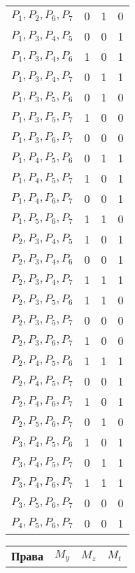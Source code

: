 \documentclass[11pt, oneside]{article}   	%
\begin{document}
\begin{table}
\begin{minipage}[t]{.3\textwidth}
\begin{tabular}{cccc}
$ P_{1}, P_{2}, P_{6}, P_{7} $ & 0 & 1 & 0 \\
$ P_{1}, P_{3}, P_{4}, P_{5} $ & 0 & 0 & 1 \\
$ P_{1}, P_{3}, P_{4}, P_{6} $ & 1 & 0 & 1 \\
$ P_{1}, P_{3}, P_{4}, P_{7} $ & 0 & 1 & 1 \\
$ P_{1}, P_{3}, P_{5}, P_{6} $ & 0 & 1 & 0 \\
$ P_{1}, P_{3}, P_{5}, P_{7} $ & 1 & 0 & 0 \\
$ P_{1}, P_{3}, P_{6}, P_{7} $ & 0 & 0 & 0 \\
$ P_{1}, P_{4}, P_{5}, P_{6} $ & 0 & 1 & 1 \\
$ P_{1}, P_{4}, P_{5}, P_{7} $ & 1 & 0 & 1 \\
$ P_{1}, P_{4}, P_{6}, P_{7} $ & 0 & 0 & 1 \\
$ P_{1}, P_{5}, P_{6}, P_{7} $ & 1 & 1 & 0 \\
$ P_{2}, P_{3}, P_{4}, P_{5} $ & 1 & 0 & 1 \\
$ P_{2}, P_{3}, P_{4}, P_{6} $ & 0 & 0 & 1 \\
$ P_{2}, P_{3}, P_{4}, P_{7} $ & 1 & 1 & 1 \\
$ P_{2}, P_{3}, P_{5}, P_{6} $ & 1 & 1 & 0 \\
$ P_{2}, P_{3}, P_{5}, P_{7} $ & 0 & 0 & 0 \\
$ P_{2}, P_{3}, P_{6}, P_{7} $ & 1 & 0 & 0 \\
$ P_{2}, P_{4}, P_{5}, P_{6} $ & 1 & 1 & 1 \\
$ P_{2}, P_{4}, P_{5}, P_{7} $ & 0 & 0 & 1 \\
$ P_{2}, P_{4}, P_{6}, P_{7} $ & 1 & 0 & 1 \\
$ P_{2}, P_{5}, P_{6}, P_{7} $ & 0 & 1 & 0 \\
$ P_{3}, P_{4}, P_{5}, P_{6} $ & 1 & 0 & 1 \\
$ P_{3}, P_{4}, P_{5}, P_{7} $ & 0 & 1 & 1 \\
$ P_{3}, P_{4}, P_{6}, P_{7} $ & 1 & 1 & 1 \\
$ P_{3}, P_{5}, P_{6}, P_{7} $ & 0 & 0 & 0 \\
$ P_{4}, P_{5}, P_{6}, P_{7} $ & 0 & 0 & 1 \\
\bottomrule
\end{tabular}
\end{minipage} \hfill
\begin{minipage}[t]{.3\textwidth}
\begin{tabular}{cccc}
\toprule
\textbf{Права} & \textbf{$M_{y}$} & \textbf{$M_{z}$} & \textbf{$M_{t}$}\\

\end{tabular}
\end{minipage}
\end{table}
\end{document}
